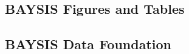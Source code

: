 \begin{appendices}

    \chapter{BAYSIS Figures and Tables}
    \label{appendix_baysis}
    
    \tocless\section{BAYSIS Data Foundation}
    \label{appendix_baysis_dataset}
    

\end{appendices}
